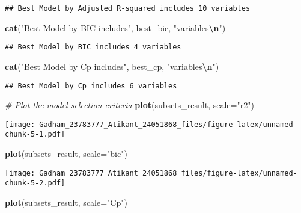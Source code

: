 \documentclass[
]{article}
\newenvironment{Shaded}{\begin{snugshade}}{\end{snugshade}}
\newcommand{\AttributeTok}[1]{\textcolor[rgb]{0.13,0.29,0.53}{#1}}
\newcommand{\CommentTok}[1]{\textcolor[rgb]{0.56,0.35,0.01}{\textit{#1}}}
\newcommand{\FunctionTok}[1]{\textcolor[rgb]{0.13,0.29,0.53}{\textbf{#1}}}
\newcommand{\NormalTok}[1]{#1}
\newcommand{\SpecialCharTok}[1]{\textcolor[rgb]{0.81,0.36,0.00}{\textbf{#1}}}
\newcommand{\StringTok}[1]{\textcolor[rgb]{0.31,0.60,0.02}{#1}}
\begin{document}
\begin{verbatim}
## Best Model by Adjusted R-squared includes 10 variables
\end{verbatim}

\begin{Shaded}
\begin{Highlighting}[]
\FunctionTok{cat}\NormalTok{(}\StringTok{"Best Model by BIC includes"}\NormalTok{, best\_bic, }\StringTok{"variables}\SpecialCharTok{\textbackslash{}n}\StringTok{"}\NormalTok{)}
\end{Highlighting}
\end{Shaded}

\begin{verbatim}
## Best Model by BIC includes 4 variables
\end{verbatim}

\begin{Shaded}
\begin{Highlighting}[]
\FunctionTok{cat}\NormalTok{(}\StringTok{"Best Model by Cp includes"}\NormalTok{, best\_cp, }\StringTok{"variables}\SpecialCharTok{\textbackslash{}n}\StringTok{"}\NormalTok{)}
\end{Highlighting}
\end{Shaded}

\begin{verbatim}
## Best Model by Cp includes 6 variables
\end{verbatim}

\begin{Shaded}
\begin{Highlighting}[]
\CommentTok{\# Plot the model selection criteria}
\FunctionTok{plot}\NormalTok{(subsets\_result, }\AttributeTok{scale=}\StringTok{"r2"}\NormalTok{)}
\end{Highlighting}
\end{Shaded}

\texttt{[image: Gadham\_23783777\_Atikant\_24051868\_files/figure-latex/unnamed-chunk-5-1.pdf]}

\begin{Shaded}
\begin{Highlighting}[]
\FunctionTok{plot}\NormalTok{(subsets\_result, }\AttributeTok{scale=}\StringTok{"bic"}\NormalTok{)}
\end{Highlighting}
\end{Shaded}

\texttt{[image: Gadham\_23783777\_Atikant\_24051868\_files/figure-latex/unnamed-chunk-5-2.pdf]}

\begin{Shaded}
\begin{Highlighting}[]
\FunctionTok{plot}\NormalTok{(subsets\_result, }\AttributeTok{scale=}\StringTok{"Cp"}\NormalTok{)}
\end{Highlighting}
\end{Shaded}
\end{document}
